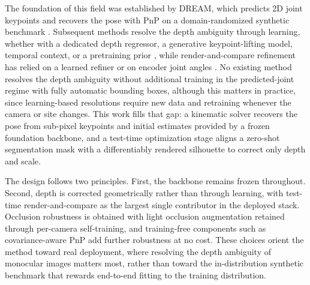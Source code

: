 The foundation of this field was established by DREAM, which predicts 2D joint keypoints and recovers the pose with PnP on a domain-randomized synthetic benchmark \cite{lee2020camera,lepetit2009ep}. Subsequent methods resolve the depth ambiguity through learning, whether with a dedicated depth regressor, a generative keypoint-lifting model, temporal context, or a pretraining prior \cite{ban2024real,tian2024robokeygen,tian2023robot,goswami2025robopepp}, while render-and-compare refinement has relied on a learned refiner or on encoder joint angles \cite{labbe2021single,lu2023markerless}. No existing method resolves the depth ambiguity without additional training in the predicted-joint regime with fully automatic bounding boxes, although this matters in practice, since learning-based resolutions require new data and retraining whenever the camera or site changes. This work fills that gap: a kinematic solver recovers the pose from sub-pixel keypoints and initial estimates provided by a frozen foundation backbone, and a test-time optimization stage aligns a zero-shot segmentation mask with a differentiably rendered silhouette to correct only depth and scale.

The design follows two principles. First, the backbone remains frozen throughout. Second, depth is corrected geometrically rather than through learning, with test-time render-and-compare as the largest single contributor in the deployed stack. Occlusion robustness is obtained with light occlusion augmentation retained through per-camera self-training, and training-free components such as covariance-aware PnP add further robustness at no cost. These choices orient the method toward real deployment, where resolving the depth ambiguity of monocular images matters most, rather than toward the in-distribution synthetic benchmark that rewards end-to-end fitting to the training distribution.

